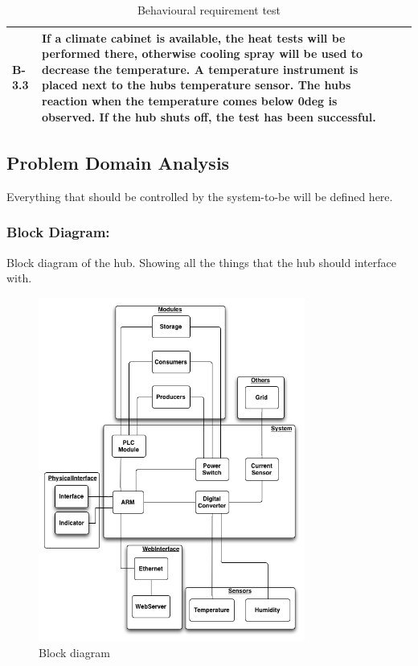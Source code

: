\begin{table}[H]
\begin{tabular} [b] {| p{1.2cm} |  p{9.3cm} | p{1.2cm} | p{3.8cm} |}
		B-3.3	& If a climate cabinet is available, the heat tests will be performed there, otherwise cooling spray will be used to decrease the temperature. A temperature instrument is placed next to the hubs temperature sensor. The hubs reaction when the temperature comes below 0deg is observed. If the hub shuts off, the test has been successful.	&	&\\ \hline
	\end{tabular}
	\caption{Behavioural requirement test}
\end{table}


\newpage
\subsection{Problem Domain Analysis}
Everything that should be controlled by the system-to-be will be defined here. 
\subsubsection{Block Diagram:}
Block diagram of the hub. Showing all the things that the hub should interface with.
	\begin{figure}[H]
		\begin{centering}
			 \includegraphics[width=0.78\textwidth]{images/block_diagram.png}
			\caption{Block diagram}
	 	\end{centering}
	\end{figure}

